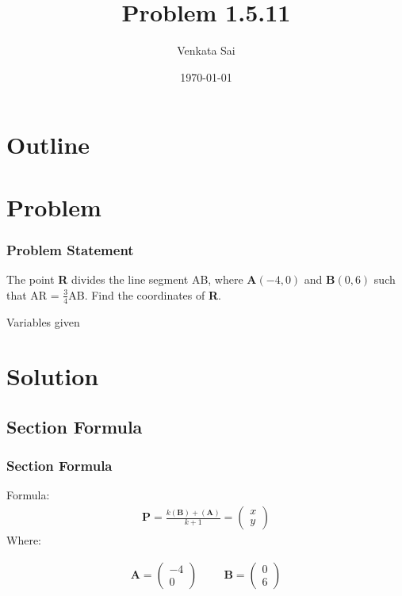 \documentclass{beamer}
\title{Problem 1.5.11}
\author{Venkata Sai}
\date{\today}
\providecommand{\brak}[1]{\ensuremath{\left(#1\right)}}
\theoremstyle{remark}
\newcommand{\myvec}[1]{\ensuremath{\begin{pmatrix}#1\end{pmatrix}}}
\let\vec\mathbf
\numberwithin{equation}{section}
\begin{document}
\begin{frame}
\titlepage
\end{frame}

\section*{Outline}
\begin{frame}
\tableofcontents
\end{frame}
\section{Problem}
\begin{frame}
\frametitle{Problem Statement}
%
 The point \textbf{R} divides the line segment AB, where \textbf{A}$\brak{-4,0}$ and \textbf{B}$\brak{0,6}$ such that
AR = $\frac{3}{4}$AB. Find the coordinates of \textbf{R}. 
 \begin{table}[h!]    
  \centering
  
  \caption{Variables given}
  \label{tab 1.4.9.2}
\end{table}
\end{frame}

\section{Solution}
\subsection{Section Formula}
\begin{frame}
\frametitle{Section Formula}
Formula:
\begin{align}
\vec{P}=\frac{k(\vec{B})+(\vec{A})}{k+1}=\myvec{x\\y}
\end{align}
Where: 


\begin{align}
\vec{A}=\myvec{-4\\0} \hspace{1cm} \vec{B}=\myvec{0\\6} 
\end{align}


\end{frame}
\end{document}
